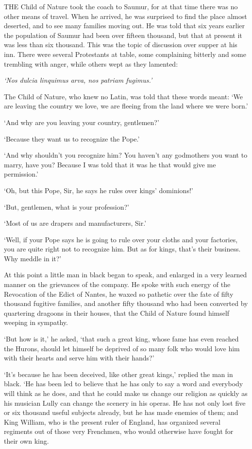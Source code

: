 \documentclass{article}
\begin{document}
\begin{center}
THE Child of Nature took the coach to Saumur, for at that time there was no other 
means of travel. When he arrived, he was surprised to find the place almost deserted, 
and to see many families moving out. He was told that six years earlier the population 
of Saumur had been over fifteen thousand, but that at present it was less than 
six thousand. This was the topic of discussion over supper at his inn. There were 
several Protestants at table, some complaining bitterly and some trembling with 
anger, while others wept as they lamented: 

\textit{`Nos dulcia linquimus arva, nos patriam fugimus.' }

The Child of Nature, who knew no Latin, was told that these words meant: `We are 
leaving the country we love, we are fleeing from the land where we were born.' 

`And why are you leaving your country, gentlemen?' 

`Because they want us to recognize the Pope.' 

`And why shouldn't you recognize him? You haven't any godmothers you want to marry, 
have you? Because I was told that it was he that would give me permission.' 

`Oh, but this Pope, Sir, he says he rules over kings' dominions!' 

`But, gentlemen, what is your profession?' 

`Most of us are drapers and manufacturers, Sir.' 

`Well, if your Pope says he is going to rule over your cloths and your factories, 
you are quite right not to recognize him. But as for kings, that's their business. 
Why meddle in it?' 

At this point a little man in black began to speak, and enlarged in a very learned 
manner on the grievances of the company. He spoke with such energy of the Revocation 
of the Edict of Nantes, he waxed so pathetic over the fate of fifty thousand fugitive 
families, and another fifty thousand who had been converted by quartering dragoons 
in their houses, that the Child of Nature found himself weeping in sympathy. 

`But how is it,' he asked, `that such a great king, whose fame has even reached 
the Hurons, should let himself be deprived of so many folk who would love him with 
their hearts and serve him with their hands?' 

`It's because he has been deceived, like other great kings,' replied the man in 
black. `He has been led to believe that he has only to say a word and everybody 
will think as he does, and that he could make us change our religion as quickly 
as his musician Lully can change the scenery in his operas. He has not only lost 
five or six thousand useful subjects already, but he has made enemies of them; 
and King William, who is the present ruler of England, has organized several regiments 
out of those very Frenchmen, who would otherwise have fought for their own king. 


\end{center}
\end{document}
